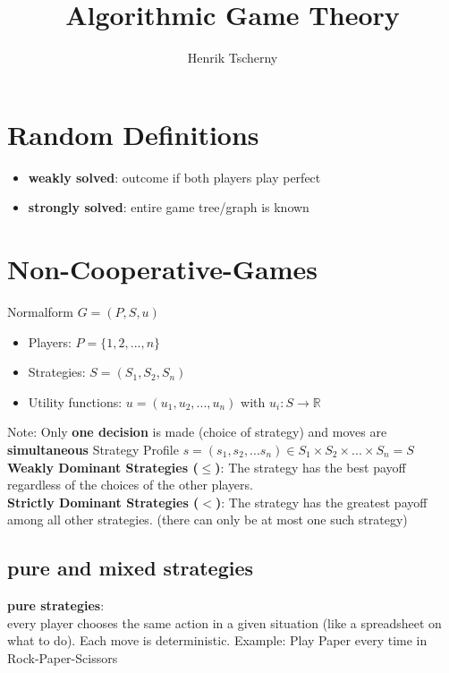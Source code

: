 \documentclass[12pt,a4paper]{article}
\title{Algorithmic Game Theory}
\author{Henrik Tscherny}
\newcommand{\ecb}[1]{\{#1\}}
\begin{document}
\maketitle
\tableofcontents



\section{Random Definitions}
\begin{itemize}
\setlength\itemsep{0.05cm}
\item \textbf{weakly solved}: outcome if both players play perfect
\item \textbf{strongly solved}: entire game tree/graph is known
\end{itemize}


\section{Non-Cooperative-Games}

Normalform $G = (P,S,u)$
\begin{itemize}
\item Players: $P = \ecb{1,2,...,n}$
\item Strategies: $S=(S_1, S_2, S_n)$
\item Utility functions: $u=(u_1,u_2,...,u_n)$ with $u_i: S \rightarrow \mathbb{R}$
\end{itemize}
Note: Only \textbf{one decision} is made (choice of strategy) and moves are \textbf{simultaneous}
Strategy Profile $s = (s_1,s_2,...s_n) \in S_1 \times S_2 \times ... \times S_n = S$
\\ 
\textbf{Weakly Dominant Strategies ($\leq$)}: The strategy has the best payoff regardless of the choices of the other players.
\\ 
\textbf{Strictly Dominant Strategies ($<$)}: The strategy has the greatest payoff among all other strategies. (there can only be at most one such strategy)


\subsection{pure and mixed strategies}
\textbf{pure strategies}:\\
every player chooses the same action in a given situation (like a spreadsheet on what to do). Each move is deterministic. Example: Play Paper every time in Rock-Paper-Scissors\\
\end{document}
